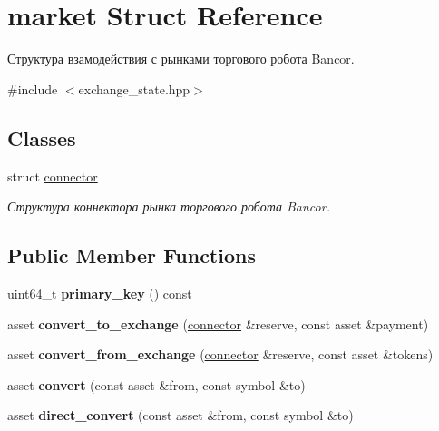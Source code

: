 \hypertarget{structmarket}{}\section{market Struct Reference}
\label{structmarket}


Структура взамодействия с рынками торгового робота Bancor.  




{\ttfamily \#include $<$exchange\+\_\+state.\+hpp$>$}

\subsection*{Classes}
\begin{DoxyCompactItemize}
\item 
struct \mbox{\hyperlink{structmarket_1_1connector}{connector}}
\begin{DoxyCompactList}\small\item\em Структура коннектора рынка торгового робота Bancor. \end{DoxyCompactList}\end{DoxyCompactItemize}
\subsection*{Public Member Functions}
\begin{DoxyCompactItemize}
\item 
\mbox{\label{structmarket_a927be547fb7499a82fc5a717e133a7b4}} 
uint64\+\_\+t {\bfseries primary\+\_\+key} () const
\item 
\mbox{\label{structmarket_a0f2926879c20545177fe18c177420bdb}} 
asset {\bfseries convert\+\_\+to\+\_\+exchange} (\mbox{\hyperlink{structmarket_1_1connector}{connector}} \&reserve, const asset \&payment)
\item 
\mbox{\label{structmarket_a868ca81f6e115b7c6d3f3894cc6bc971}} 
asset {\bfseries convert\+\_\+from\+\_\+exchange} (\mbox{\hyperlink{structmarket_1_1connector}{connector}} \&reserve, const asset \&tokens)
\item 
\mbox{\label{structmarket_ab329c1ef0f3b4569b0d1786736cc3794}} 
asset {\bfseries convert} (const asset \&from, const symbol \&to)
\item 
\mbox{\label{structmarket_a5d5041e0aaf2cb29bad70644d264d579}} 
asset {\bfseries direct\+\_\+convert} (const asset \&from, const symbol \&to)
\end{DoxyCompactItemize}
